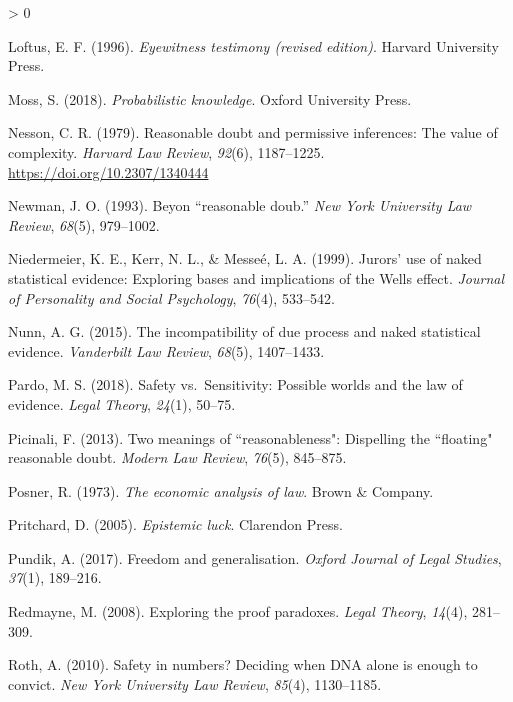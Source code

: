 \documentclass[
  10pt,
  dvipsnames,enabledeprecatedfontcommands]{scrartcl}
\newlength{\cslhangindent}
\newenvironment{CSLReferences}[2] %
 {%
  \setlength{\parindent}{0pt}
  \ifodd #1 \everypar{\setlength{\hangindent}{\cslhangindent}}\ignorespaces\fi
  \ifnum #2 > 0
  \setlength{\parskip}{#2\baselineskip}
  \fi
 }%
 {}
\begin{document}
\begin{CSLReferences}{1}{0}
\leavevmode\hypertarget{ref-Loftus1996}{}%
Loftus, E. F. (1996). \emph{Eyewitness testimony (revised edition)}.
Harvard University Press.

\leavevmode\hypertarget{ref-moss2018}{}%
Moss, S. (2018). \emph{Probabilistic knowledge}. Oxford University
Press.

\leavevmode\hypertarget{ref-Nesson1979Reasonable-doub}{}%
Nesson, C. R. (1979). Reasonable doubt and permissive inferences: The
value of complexity. \emph{Harvard Law Review}, \emph{92}(6),
1187--1225. \url{https://doi.org/10.2307/1340444}

\leavevmode\hypertarget{ref-newman1993}{}%
Newman, J. O. (1993). Beyon {``reasonable doub.''} \emph{New York
University Law Review}, \emph{68}(5), 979--1002.

\leavevmode\hypertarget{ref-niedermeierEtAl1999}{}%
Niedermeier, K. E., Kerr, N. L., \& Messeé, L. A. (1999). Jurors' use of
naked statistical evidence: Exploring bases and implications of the
{Wells} effect. \emph{Journal of Personality and Social Psychology},
\emph{76}(4), 533--542.

\leavevmode\hypertarget{ref-nunn2015}{}%
Nunn, A. G. (2015). The incompatibility of due process and naked
statistical evidence. \emph{Vanderbilt Law Review}, \emph{68}(5),
1407--1433.

\leavevmode\hypertarget{ref-pardo2018}{}%
Pardo, M. S. (2018). Safety vs.~Sensitivity: Possible worlds and the law
of evidence. \emph{Legal Theory}, \emph{24}(1), 50--75.

\leavevmode\hypertarget{ref-picinali2013}{}%
Picinali, F. (2013). Two meanings of ``reasonableness": Dispelling the
``floating" reasonable doubt. \emph{Modern Law Review}, \emph{76}(5),
845--875.

\leavevmode\hypertarget{ref-Posner1973}{}%
Posner, R. (1973). \emph{The economic analysis of law}. Brown \&
Company.

\leavevmode\hypertarget{ref-pritchard2005epistemic}{}%
Pritchard, D. (2005). \emph{Epistemic luck}. Clarendon Press.

\leavevmode\hypertarget{ref-pundik2017}{}%
Pundik, A. (2017). Freedom and generalisation. \emph{Oxford Journal of
Legal Studies}, \emph{37}(1), 189--216.

\leavevmode\hypertarget{ref-redmayne2008exploring}{}%
Redmayne, M. (2008). Exploring the proof paradoxes. \emph{Legal Theory},
\emph{14}(4), 281--309.

\leavevmode\hypertarget{ref-Roth2010}{}%
Roth, A. (2010). Safety in numbers? {D}eciding when {DNA} alone is
enough to convict. \emph{New York University Law Review}, \emph{85}(4),
1130--1185.


\end{CSLReferences}
\end{document}
